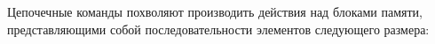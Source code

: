 Цепочечные команды похволяют производить действия над блоками памяти,
представляющими собой последовательности элементов следующего размера:

